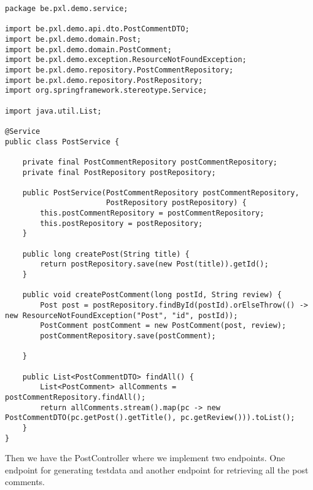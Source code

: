 \begin{lstlisting}
package be.pxl.demo.service;

import be.pxl.demo.api.dto.PostCommentDTO;
import be.pxl.demo.domain.Post;
import be.pxl.demo.domain.PostComment;
import be.pxl.demo.exception.ResourceNotFoundException;
import be.pxl.demo.repository.PostCommentRepository;
import be.pxl.demo.repository.PostRepository;
import org.springframework.stereotype.Service;

import java.util.List;

@Service
public class PostService {

    private final PostCommentRepository postCommentRepository;
    private final PostRepository postRepository;

    public PostService(PostCommentRepository postCommentRepository,
                       PostRepository postRepository) {
        this.postCommentRepository = postCommentRepository;
        this.postRepository = postRepository;
    }

    public long createPost(String title) {
        return postRepository.save(new Post(title)).getId();
    }

    public void createPostComment(long postId, String review) {
        Post post = postRepository.findById(postId).orElseThrow(() -> new ResourceNotFoundException("Post", "id", postId));
        PostComment postComment = new PostComment(post, review);
        postCommentRepository.save(postComment);

    }

    public List<PostCommentDTO> findAll() {
        List<PostComment> allComments = postCommentRepository.findAll();
        return allComments.stream().map(pc -> new PostCommentDTO(pc.getPost().getTitle(), pc.getReview())).toList();
    }
}
\end{lstlisting}

Then we have the PostController where we implement two endpoints. One endpoint for generating testdata and another endpoint for retrieving all the post comments.

